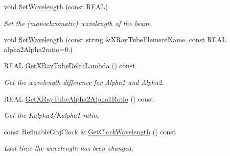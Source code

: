 \begin{DoxyCompactItemize}
\item 
\mbox{\label{class_obj_cryst_1_1_radiation_ac40cb0879be00b232a6c3e78c069823d}} 
void \mbox{\hyperlink{class_obj_cryst_1_1_radiation_ac40cb0879be00b232a6c3e78c069823d}{Set\+Wavelength}} (const R\+E\+AL)
\begin{DoxyCompactList}\small\item\em Set the (monochromatic) wavelength of the beam. \end{DoxyCompactList}\item 
void \mbox{\hyperlink{class_obj_cryst_1_1_radiation_a61393e596990f9fdac7dfc6d8acd91ac}{Set\+Wavelength}} (const string \&X\+Ray\+Tube\+Element\+Name, const R\+E\+AL alpha2\+Alpha2ratio=0.)
\item 
\mbox{\label{class_obj_cryst_1_1_radiation_a7d31149ae629b3ea409d14b0c87cc4d2}} 
R\+E\+AL \mbox{\hyperlink{class_obj_cryst_1_1_radiation_a7d31149ae629b3ea409d14b0c87cc4d2}{Get\+X\+Ray\+Tube\+Delta\+Lambda}} () const
\begin{DoxyCompactList}\small\item\em Get the wavelength difference for Alpha1 and Alpha2. \end{DoxyCompactList}\item 
\mbox{\label{class_obj_cryst_1_1_radiation_a3c69218e5687255e86bff12f95967eb7}} 
R\+E\+AL \mbox{\hyperlink{class_obj_cryst_1_1_radiation_a3c69218e5687255e86bff12f95967eb7}{Get\+X\+Ray\+Tube\+Alpha2\+Alpha1\+Ratio}} () const
\begin{DoxyCompactList}\small\item\em Get the Kalpha2/\+Kalpha1 ratio. \end{DoxyCompactList}\item 
\mbox{\label{class_obj_cryst_1_1_radiation_a8a20977edd2c2a9696ecd6a8995e902b}} 
const Refinable\+Obj\+Clock \& \mbox{\hyperlink{class_obj_cryst_1_1_radiation_a8a20977edd2c2a9696ecd6a8995e902b}{Get\+Clock\+Wavelength}} () const
\begin{DoxyCompactList}\small\item\em Last time the wavelength has been changed. \end{DoxyCompactList}\item 
\mbox{\label{class_obj_cryst_1_1_radiation_aaaaad05a30a89eb27253351a4e33107b}} 

\end{DoxyCompactItemize}
